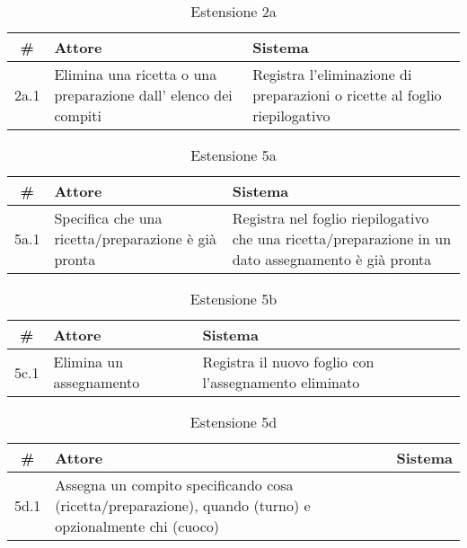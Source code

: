 \begin{table}[H]\centering\caption*{Estensione 2a}
    \small
    \begin{tabular}{|c|p{7cm}|p{6.23cm}|}
        \hline\bfseries \# & \bfseries Attore                                                             & \bfseries Sistema                                                         \\\hline
        2a.1               & Elimina una ricetta o una preparazione dall’ elenco dei compiti & Registra l’eliminazione di preparazioni o ricette al foglio riepilogativo \\\hline
    \end{tabular}
\end{table}

\begin{table}[H]\centering\caption*{Estensione 5a}
    \small
    \begin{tabular}{|c|p{7cm}|p{6.23cm}|}
        \hline\bfseries \# & \bfseries Attore                                    & \bfseries Sistema                                                                                   \\\hline
        5a.1               & Specifica che una ricetta/preparazione è già pronta & Registra nel foglio riepilogativo che una ricetta/preparazione in un dato assegnamento è già pronta \\\hline
    \end{tabular}
\end{table}

\begin{table}[H]\centering\caption*{Estensione 5b}
    \small
    \begin{tabular}{|c|p{7cm}|p{6.23cm}|}
        \hline\bfseries \# & \bfseries Attore        & \bfseries Sistema                                     \\\hline
        5c.1               & Elimina un assegnamento & Registra il nuovo foglio con l’assegnamento eliminato \\\hline
    \end{tabular}
\end{table}

\begin{table}\centering\caption*{Estensione 5d}
    \small
    \begin{tabular}{|c|p{7cm}|p{6.23cm}|}
        \hline\bfseries \# & \bfseries Attore                                                                                        & \bfseries Sistema                                 \\\hline
        5d.1               & Assegna un compito specificando cosa (ricetta/preparazione), quando (turno) e opzionalmente chi (cuoco) & \color{red}{Cuoco non disponibile nel dato turno} \\\hline
    \end{tabular}
\end{table}